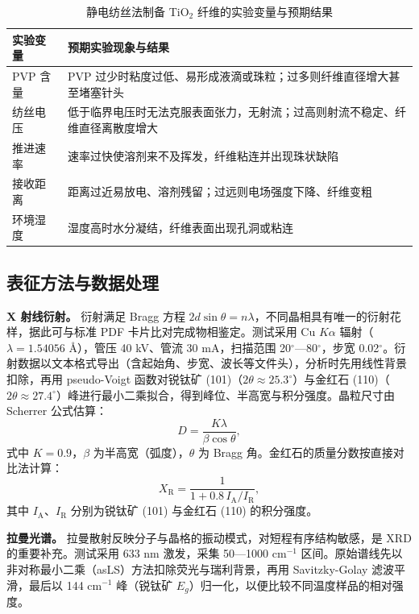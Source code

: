 \begin{table}[htbp]
  \centering
  \caption{静电纺丝法制备 TiO$_2$ 纤维的实验变量与预期结果}
  \label{tab:es}
  \footnotesize
  \begin{tabular}{@{}p{2.4cm}p{4.1cm}@{}}
    \toprule
    实验变量 & 预期实验现象与结果 \\
    \midrule
    PVP 含量 & PVP 过少时粘度过低、易形成液滴或珠粒；过多则纤维直径增大甚至堵塞针头 \\
    纺丝电压 & 低于临界电压时无法克服表面张力，无射流；过高则射流不稳定、纤维直径离散度增大 \\
    推进速率 & 速率过快使溶剂来不及挥发，纤维粘连并出现珠状缺陷 \\
    接收距离 & 距离过近易放电、溶剂残留；过远则电场强度下降、纤维变粗 \\
    环境湿度 & 湿度高时水分凝结，纤维表面出现孔洞或粘连 \\
    \bottomrule
  \end{tabular}
\end{table}

\subsection{表征方法与数据处理}

\textbf{X 射线衍射。} 衍射满足 Bragg 方程 $2d\sin\theta=n\lambda$，不同晶相具有唯一的衍射花样，据此可与标准 PDF 卡片比对完成物相鉴定\cite{shi2014xrd,zhou1999衍射}。测试采用 Cu $K\alpha$ 辐射（$\lambda=1.54056$ \AA），管压 40 kV、管流 30 mA，扫描范围 20$^\circ$—80$^\circ$，步宽 0.02$^\circ$。衍射数据以文本格式导出（含起始角、步宽、波长等文件头），分析时先用线性背景扣除，再用 pseudo-Voigt 函数对锐钛矿 (101)（$2\theta\approx25.3^\circ$）与金红石 (110)（$2\theta\approx27.4^\circ$）峰进行最小二乘拟合，得到峰位、半高宽与积分强度。晶粒尺寸由 Scherrer 公式估算：
\begin{equation}
  D=\frac{K\lambda}{\beta\cos\theta},
  \label{eq:scherrer}
\end{equation}
式中 $K=0.9$，$\beta$ 为半高宽（弧度），$\theta$ 为 Bragg 角。金红石的质量分数按直接对比法计算：
\begin{equation}
  X_{\mathrm{R}}=\frac{1}{1+0.8\,I_{\mathrm{A}}/I_{\mathrm{R}}},
  \label{eq:rutile}
\end{equation}
其中 $I_{\mathrm{A}}$、$I_{\mathrm{R}}$ 分别为锐钛矿 (101) 与金红石 (110) 的积分强度。

\textbf{拉曼光谱。} 拉曼散射反映分子与晶格的振动模式，对短程有序结构敏感，是 XRD 的重要补充\cite{wang2005表征}。测试采用 633 nm 激发，采集 50—1000 cm$^{-1}$ 区间。原始谱线先以非对称最小二乘（asLS）方法扣除荧光与瑞利背景，再用 Savitzky-Golay 滤波平滑，最后以 144 cm$^{-1}$ 峰（锐钛矿 $E_g$）归一化，以便比较不同温度样品的相对强度。

